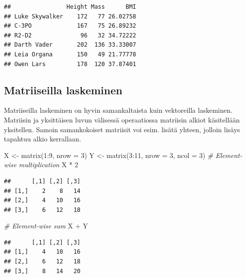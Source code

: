 \documentclass[
]{book}
\newenvironment{Shaded}{\begin{snugshade}}{\end{snugshade}}
\newcommand{\AttributeTok}[1]{\textcolor[rgb]{0.77,0.63,0.00}{#1}}
\newcommand{\CommentTok}[1]{\textcolor[rgb]{0.56,0.35,0.01}{\textit{#1}}}
\newcommand{\DecValTok}[1]{\textcolor[rgb]{0.00,0.00,0.81}{#1}}
\newcommand{\FunctionTok}[1]{\textcolor[rgb]{0.00,0.00,0.00}{#1}}
\newcommand{\NormalTok}[1]{#1}
\newcommand{\OtherTok}[1]{\textcolor[rgb]{0.56,0.35,0.01}{#1}}
\newcommand{\SpecialCharTok}[1]{\textcolor[rgb]{0.00,0.00,0.00}{#1}}
\begin{document}
\begin{verbatim}
##                Height Mass      BMI
## Luke Skywalker    172   77 26.02758
## C-3PO             167   75 26.89232
## R2-D2              96   32 34.72222
## Darth Vader       202  136 33.33007
## Leia Organa       150   49 21.77778
## Owen Lars         178  120 37.87401
\end{verbatim}

\hypertarget{matriiseilla-laskeminen}{%
\subsection{Matriiseilla laskeminen}\label{matriiseilla-laskeminen}}

Matriiseilla laskeminen on hyvin samankaltaista kuin vektoreilla laskeminen. Matriisin ja yksittäisen luvun välisessä operaatiossa matriisin alkiot käsitellään yksitellen. Samoin samankokoiset matriisit voi esim. lisätä yhteen, jolloin lisäys tapahtuu alkio kerrallaan.

\begin{Shaded}
\begin{Highlighting}[]
\NormalTok{X }\OtherTok{\textless{}{-}} \FunctionTok{matrix}\NormalTok{(}\DecValTok{1}\SpecialCharTok{:}\DecValTok{9}\NormalTok{, }\AttributeTok{nrow =} \DecValTok{3}\NormalTok{)}
\NormalTok{Y }\OtherTok{\textless{}{-}} \FunctionTok{matrix}\NormalTok{(}\DecValTok{3}\SpecialCharTok{:}\DecValTok{11}\NormalTok{, }\AttributeTok{nrow =} \DecValTok{3}\NormalTok{, }\AttributeTok{ncol =} \DecValTok{3}\NormalTok{)}
\CommentTok{\# Element{-}wise multiplication}
\NormalTok{X }\SpecialCharTok{*} \DecValTok{2}
\end{Highlighting}
\end{Shaded}

\begin{verbatim}
##      [,1] [,2] [,3]
## [1,]    2    8   14
## [2,]    4   10   16
## [3,]    6   12   18
\end{verbatim}

\begin{Shaded}
\begin{Highlighting}[]
\CommentTok{\# Element{-}wise sum}
\NormalTok{X }\SpecialCharTok{+}\NormalTok{ Y}
\end{Highlighting}
\end{Shaded}

\begin{verbatim}
##      [,1] [,2] [,3]
## [1,]    4   10   16
## [2,]    6   12   18
## [3,]    8   14   20
\end{verbatim}
\end{document}
